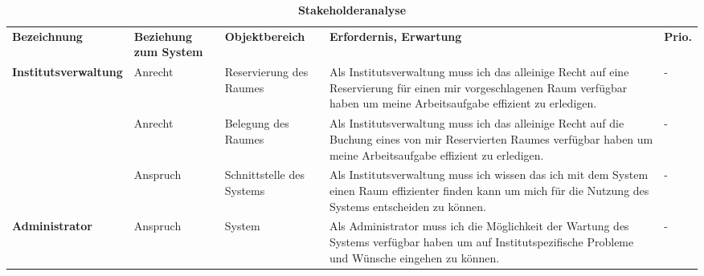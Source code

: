 \begin{table}[h]
	
 	\caption{\textbf{Stakeholderanalyse}}
 	\begin{tabularx}{\textwidth}{|X|X|X|X|m{}|}			
 		\rowcolor{heading}\textbf{Bezeichnung} & \textbf{Beziehung zum System} & \textbf{Objektbereich} & \textbf{Erfordernis, Erwartung} & \textbf{Prio.}\\
			 
 	\textbf{Institutsverwaltung} & Anrecht & Reservierung des Raumes & Als Institutsverwaltung muss ich das alleinige Recht auf eine Reservierung für einen mir vorgeschlagenen Raum verfügbar haben um meine Arbeitsaufgabe effizient zu erledigen. & -\\
\rowcolor{odd} & Anrecht & Belegung des Raumes & Als Institutsverwaltung muss ich das alleinige Recht auf die Buchung eines von mir Reservierten Raumes verfügbar haben um meine Arbeitsaufgabe effizient zu erledigen. & -\\
	& Anspruch & Schnittstelle des Systems & Als Institutsverwaltung muss ich wissen das ich mit dem System einen Raum effizienter finden kann um mich für die Nutzung des Systems entscheiden zu können. & -\\
\rowcolor{odd} \textbf{Administrator} & Anspruch & 	System & Als Administrator muss ich die Möglichkeit der Wartung des Systems verfügbar haben um auf Institutspezifische Probleme und Wünsche eingehen zu können. & -\\ \hline
 	\end{tabularx}
 	
\end{table}

